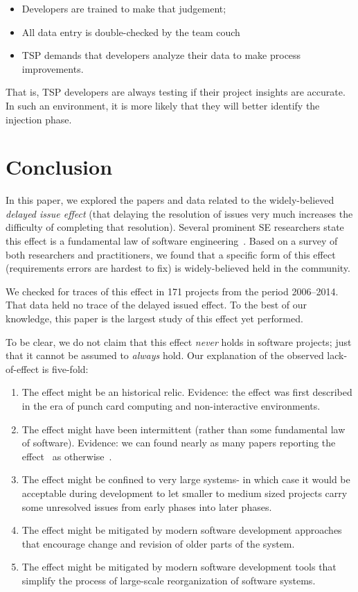 \documentclass[smallcondesed]{svjour3}
\newcommand{\bi}{\begin{itemize}}%
\newcommand{\ei}{\end{itemize}}
\newcommand{\be}{\begin{enumerate}}
\newcommand{\ee}{\end{enumerate}}
\begin{document}
\bi
\item Developers are trained   to make that judgement;
\item All data entry is double-checked by the team couch 
\item TSP demands that developers analyze their data to make
process improvements. 
\ei
That is, TSP developers are always testing
if their project insights are accurate. In such an environment,
it is more likely that they will better identify the injection phase.
 
 
 \section{Conclusion}
  
 
In this paper, we explored   the papers and data related to the 
widely-believed {\em delayed issue effect} (that delaying the resolution of issues
very much 
increases the difficulty of completing that  resolution).
Several prominent SE researchers state this effect is a fundamental law of software engineering~\cite{boehm01,mcconnell01,boehm01,glass02}.
Based on a  survey  of both researchers and practitioners, we  found that
a specific form  of this effect (requirements errors are hardest to fix) is  widely-believed
held in the community.  

We checked for traces of this effect in 171 projects from the period 2006--2014.
That data held no trace of the delayed issued effect.
To the best of our knowledge, this paper is the  largest study
of this effect yet performed.

To be clear, we do not claim that this effect {\em never} holds in software projects; just that it cannot be assumed to {\em always} hold. Our explanation of the observed lack-of-effect is five-fold:
\be
\item The effect might be an historical relic. Evidence:
the effect was first described in the era of punch card computing and non-interactive environments.
\item The effect might have been intermittent (rather than some fundamental law of software). Evidence: we can  found nearly
as many papers reporting the effect~\cite{Boehm76,Boehm81,steck04,Fagan76,Stephenson76} as otherwise~\cite{Royce98,Boehm80,Shull02}.
\item The effect might be confined to very large systems- in which case it would be
acceptable during development to let smaller to medium
sized projects carry some unresolved issues from early phases into later phases.
\item The effect might be mitigated by modern software development approaches that
encourage change and revision of older parts of the system.
\item The effect might be mitigated by modern software development tools
that simplify the process of large-scale reorganization of software systems.
\ee
  
\end{document}
